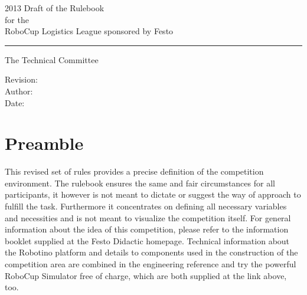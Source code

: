 \documentclass[12pt,twoside]{article}
\begin{document}


\begin{titlepage}
  \vspace*{5cm}
  \begin{center}
    \begin{LARGE}
      2013 Draft of the Rulebook\\[2ex]
      for the\\[2ex]
      RoboCup Logistics League sponsored by Festo\\[4ex]
    \end{LARGE}
    \hrule
    
    \vspace*{4ex}
    \begin{Large}
      The Technical Committee\\[6ex]
    \end{Large}
  \end{center}
  \vspace*{4cm}
  
  \noindent
  Revision: \\[2ex]
  Author: \\[2ex]
  Date: \\[2ex]  
\end{titlepage}
\thispagestyle{empty}
\pagebreak
\cleardoublepage

\setcounter{page}{1}
\tableofcontents
\newpage
\cleardoublepage


\setcounter{page}{1}


\section*{Preamble}

This revised set of rules provides a precise definition of the
competition environment. The rulebook ensures the same and fair
circumstances for all participants, it however is not meant to dictate
or suggest the way of approach to fulfill the task. Furthermore it
concentrates on defining all necessary variables and necessities and
is not meant to visualize the competition itself. For general
information about the idea of this competition, please refer to the
information booklet supplied at the Festo Didactic homepage. Technical
information about the Robotino platform and details to components
used in the construction of the competition area are combined in the
engineering reference and try the powerful RoboCup Simulator free of
charge, which are both supplied at the link above, too.
\end{document}
